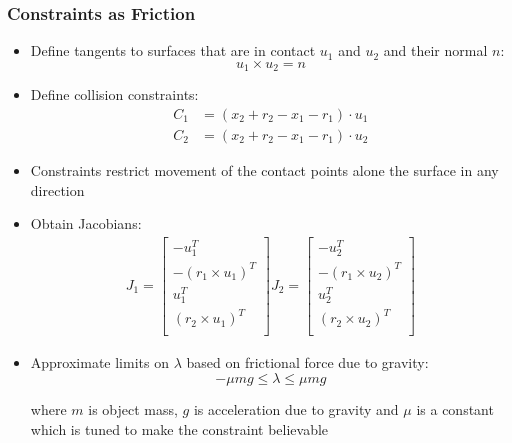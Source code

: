\documentclass[a4paper]{article}
\begin{document}
\subsubsection{Constraints as Friction}

\begin{itemize}
  \item
    Define tangents to surfaces that are in contact $u_{1}$ and $u_{2}$ and
    their normal $n$:
    \[
      u_{1} \times u_{2} = n
    \]

  \item
    Define collision constraints:
    \begin{align*}
      C_{1} &= (x_{2} + r_{2} - x_{1} - r_{1}) \cdot u_{1} \\
      C_{2} &= (x_{2} + r_{2} - x_{1} - r_{1}) \cdot u_{2}
    \end{align*}

  \item
    Constraints restrict movement of the contact points alone the surface in any
    direction

  \item
    Obtain Jacobians:
    \begin{align*}
      J_{1} = \left[
                \begin{array}{c}
                  -u_{1}^{T}                \\
                  -(r_{1} \times u_{1})^{T} \\
                  u_{1}^{T}                 \\
                  (r_{2} \times u_{1})^{T}  \\
                \end{array}
              \right]
      J_{2} = \left[
                \begin{array}{c}
                  -u_{2}^{T}                \\
                  -(r_{1} \times u_{2})^{T} \\
                  u_{2}^{T}                 \\
                  (r_{2} \times u_{2})^{T}  \\
                \end{array}
              \right]
    \end{align*}

  \item
    Approximate limits on $\lambda$ based on frictional force due to gravity:
    \[
      -\mu m g \leq \lambda \leq \mu m g
    \]

    where $m$ is object mass, $g$ is acceleration due to gravity and $\mu$ is a
    constant which is tuned to make the constraint believable

\end{itemize}
\end{document}
